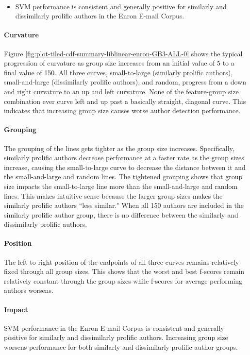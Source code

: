 \paragraph*{} 
	\begin{itemize}
	\item SVM performance is consistent and generally positive for similarly and dissimilarly prolific authors in the Enron E-mail Corpus.
	\end{itemize}
	\paragraph*{Curvature}Figure \ref{fig:plot-tiled-cdf-summary-liblinear-enron-GB3-ALL-0} shows the typical progression of curvature as group size increases from an initial value of 5 to a final value of 150.  All three curves, small-to-large (similarly prolific authors), small-and-large (dissimilarly prolific authors), and random, progress from a down and right curvature to an up and left curvature.  None of the feature-group size combination ever curve left and up past a basically straight, diagonal curve.  This indicates that increasing group size causes worse author detection performance.
	\paragraph*{Grouping} The grouping of the lines gets tighter as the group size increases.  Specifically, similarly prolific authors decrease performance at a faster rate as the group sizes increase, causing the small-to-large curve to decrease the distance between it and the small-and-large and random lines.  The tightened grouping shows that group size impacts the small-to-large line more than the small-and-large and random lines.  This makes intuitive sense because the larger group sizes makes the similarly prolific authors ``less similar."  When all 150 authors are included in the similarly prolific author group, there is no difference between the similarly and dissimilarly prolific authors.  
	\paragraph*{Position}The left to right position of the endpoints of all three curves remains relatively fixed through all group sizes.  This shows that the worst and best f-scores remain relatively constant through the group sizes while f-scores for average performing authors worsens.  
	\paragraph*{Impact} SVM performance in the Enron E-mail Corpus is consistent and generally positive for similarly and dissimilarly prolific authors.  Increasing group size worsens performance for both similarly and dissimilarly prolific author groups.
	

